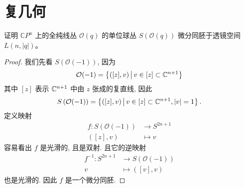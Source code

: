 \chapter{复几何}
\begin{problem}
    证明 $\mathbb{C}P^n$ 上的全纯线丛 $\mathcal{O}(q)$ 的单位球丛 
    $S\left(\mathcal{O}(q)\right)$ 微分同胚于透镜空间 $L(n,|q|)$。
\end{problem}
\begin{proof}
    我们先看 $S\left(\mathcal{O}(-1)\right)$, 因为
    \[
        \mathcal{O}(-1)=\left\{([z],v)\,\big|\,v\in [z]\subset\mathbb{C}^{n+1}\right\}
    \]
    其中 $[z]$ 表示 $\mathbb{C}^{n+1}$ 中由 $z$ 张成的复直线,
    因此
    \[
        S\left(\mathcal{O}(-1)\right)=\left\{([z],v)\,\big|\,v\in [z]\subset\mathbb{C}^{n+1},|v|=1\right\}.    
    \]
    定义映射
    \begin{align*}
        f: S\left(\mathcal{O}(-1)\right) & \to S^{2n+1} \\
        ([z],v) & \mapsto v
    \end{align*}
    容易看出 $f$ 是光滑的, 且是双射. 且它的逆映射
    \begin{align*}
        f^{-1}: S^{2n+1} & \to S\left(\mathcal{O}(-1)\right) \\
        v & \mapsto ([v],v)
    \end{align*}
    也是光滑的. 因此 $f$ 是一个微分同胚. 
    

\end{proof}
